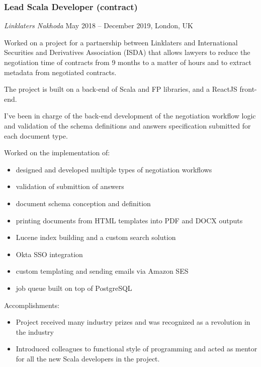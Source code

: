\documentclass[
]{rss}
\providecommand{\tightlist}{%
  \setlength{\itemsep}{0pt}\setlength{\parskip}{0pt}}
\begin{document}
\begin{resume}
\hypertarget{lead-scala-developer-contract-1}{%
\subsubsection{Lead Scala Developer
(contract)}\label{lead-scala-developer-contract-1}}

\emph{Linklaters \textbar{} Nakhoda} May 2018 -- December 2019, London,
UK

Worked on a project for a partnership between Linklaters and
International Securities and Derivatives Association (ISDA) that allows
lawyers to reduce the negotiation time of contracts from 9 months to a
matter of hours and to extract metadata from negotiated contracts.

The project is built on a back-end of Scala and FP libraries, and a
ReactJS front-end.

I've been in charge of the back-end development of the negotiation
workflow logic and validation of the schema definitions and answers
specification submitted for each document type.

Worked on the implementation of:

\begin{itemize}
\tightlist
\item
  designed and developed multiple types of negotiation workflows
\item
  validation of submittion of answers
\item
  document schema conception and definition
\item
  printing documents from HTML templates into PDF and DOCX outputs
\item
  Lucene index building and a custom search solution
\item
  Okta SSO integration
\item
  custom templating and sending emails via Amazon SES
\item
  job queue built on top of PostgreSQL
\end{itemize}

Accomplishments:

\begin{itemize}
\tightlist
\item
  Project received many industry prizes and was recognized as a
  revolution in the industry
\item
  Introduced colleagues to functional style of programming and acted as
  mentor for all the new Scala developers in the project.
\end{itemize}


\end{resume}
\end{document}
